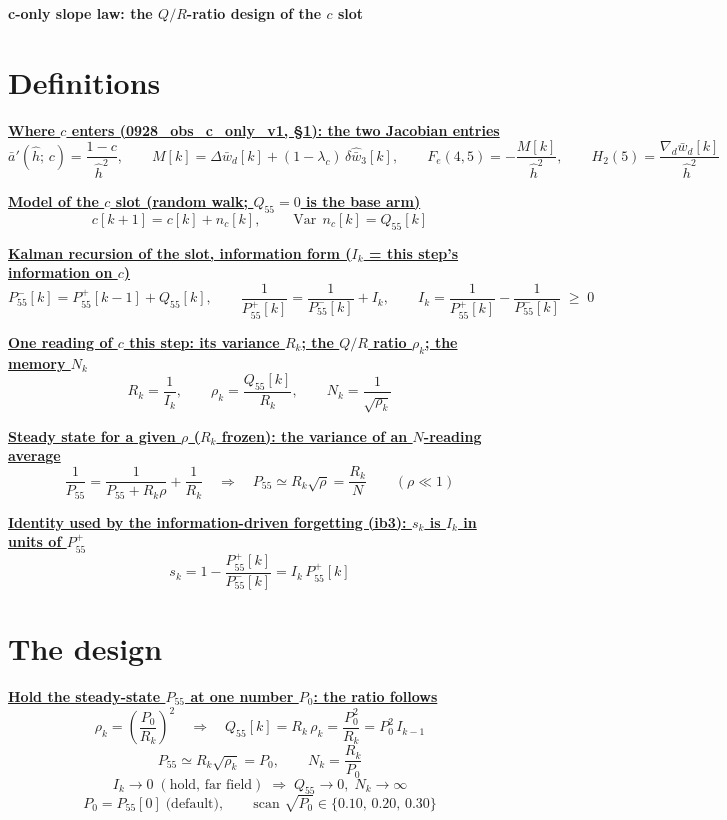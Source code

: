 \documentclass[11pt,a4paper]{ctexart}
\newcommand{\lc}{\lambda_c}
\newcommand{\ba}{\bar{a}}
\newcommand{\bw}{\bar{w}}
\newcommand{\dW}{\Delta\bw}
\newcommand{\ap}{\ba'}
\newcommand{\wh}{\hat{\bw}}
\newcommand{\hh}{\hat{h}}
\newcommand{\Pm}{P_{55}^{-}}
\newcommand{\Pp}{P_{55}^{+}}
\newcommand{\hd}[1]{\par\bigskip\noindent\underline{\textbf{#1}}}
\begin{document}
\begin{center}\textbf{\large c-only slope law: the $Q/R$-ratio design of the $c$ slot}\end{center}

\section{Definitions}

\hd{Where $c$ enters (0928\_obs\_c\_only\_v1, \S1): the two Jacobian entries}
\[
\ap(\hh;\,c) = \frac{1-c}{\hh^{2}}, \qquad
M[k] = \dW_d[k] + (1-\lc)\,\delta\wh_3[k], \qquad
F_e(4,5) = -\frac{M[k]}{\hh^{2}}, \qquad
H_2(5) = \frac{\nabla_d\bw_d[k]}{\hh^{2}}
\]

\hd{Model of the $c$ slot (random walk; $Q_{55} = 0$ is the base arm)}
\[
c[k+1] = c[k] + n_c[k], \qquad \operatorname{Var}\, n_c[k] = Q_{55}[k]
\]

\hd{Kalman recursion of the slot, information form ($I_k$ = this step's information on $c$)}
\[
\Pm[k] = \Pp[k-1] + Q_{55}[k], \qquad
\frac{1}{\Pp[k]} = \frac{1}{\Pm[k]} + I_k, \qquad
I_k = \frac{1}{\Pp[k]} - \frac{1}{\Pm[k]} \;\ge\; 0
\]

\hd{One reading of $c$ this step: its variance $R_k$; the $Q/R$ ratio $\rho_k$; the memory $N_k$}
\[
R_k = \frac{1}{I_k}, \qquad
\rho_k = \frac{Q_{55}[k]}{R_k}, \qquad
N_k = \frac{1}{\sqrt{\rho_k}}
\]

\hd{Steady state for a given $\rho$ ($R_k$ frozen): the variance of an $N$-reading average}
\[
\frac{1}{P_{55}} = \frac{1}{P_{55} + R_k\rho} + \frac{1}{R_k}
\quad\Longrightarrow\quad
P_{55} \simeq R_k\sqrt{\rho} = \frac{R_k}{N}
\qquad (\rho \ll 1)
\]

\hd{Identity used by the information-driven forgetting (ib3): $s_k$ is $I_k$ in units of $\Pp$}
\[
s_k = 1 - \frac{\Pp[k]}{\Pm[k]} = I_k\,\Pp[k]
\]

\clearpage
\section{The design}

\hd{Hold the steady-state $P_{55}$ at one number $P_0$: the ratio follows}
\[
\rho_k = \left(\frac{P_0}{R_k}\right)^{2}
\quad\Longrightarrow\quad
Q_{55}[k] = R_k\,\rho_k = \frac{P_0^{2}}{R_k} = P_0^{2}\, I_{k-1}
\]
\[
P_{55} \simeq R_k\sqrt{\rho_k} = P_0,
\qquad
N_k = \frac{R_k}{P_0}
\]
\[
I_k \to 0 \;(\text{hold, far field}) \;\Longrightarrow\; Q_{55} \to 0,\; N_k \to \infty
\]
\[
P_0 = P_{55}[0] \;\text{(default)}, \qquad \text{scan } \sqrt{P_0} \in \{0.10,\, 0.20,\, 0.30\}
\]
\end{document}
